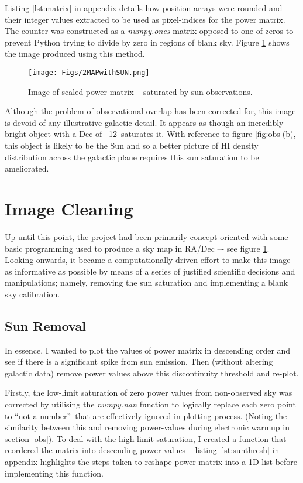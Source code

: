 \documentclass[11pt]{article} %
\begin{document}
Listing \ref{lst:matrix} in appendix details how position arrays were rounded and their integer values extracted to be used as pixel-indices for the power matrix. The counter was constructed as a \textit{numpy.ones} matrix opposed to one of zeros to prevent Python trying to divide by zero in regions of blank sky. Figure \ref{fig:matrix} shows the image produced using this method.



\begin{figure}
\centering
\texttt{[image: Figs/2MAPwithSUN.png]}
\caption{Image of scaled power matrix – saturated by sun observations.}
\label{fig:matrix}
\end{figure}

Although the problem of observational overlap has been corrected for, this image is devoid of any illustrative galactic detail. It appears as though an incredibly bright object with a Dec of ~12\degree~saturates it. With reference to figure \ref{fig:obs}(b), this object is likely to be the Sun and so a better picture of HI density distribution across the galactic plane requires this sun saturation to be ameliorated.

\section{Image Cleaning} \label{cleaning}

Up until this point, the project had been primarily concept-oriented with some basic programming used to produce a sky map in RA/Dec –- see figure \ref{fig:matrix}. Looking onwards, it became a computationally driven effort to make this image as informative as possible by means of a series of justified scientific decisions and manipulations; namely, removing the sun saturation and implementing a blank sky calibration.

\subsection{Sun Removal}

In essence, I wanted to plot the values of power matrix in descending order and see if there is a significant spike from sun emission. Then (without altering galactic data) remove power values above this discontinuity threshold and re-plot.

Firstly, the low-limit saturation of zero power values from non-observed sky was corrected by utilising the \textit{numpy.nan} function to logically replace each zero point to \textquotedblleft not a number\textquotedblright~that are effectively ignored in plotting process. (Noting the similarity between this and removing power-values during electronic warmup in section \ref{obs}). To deal with the high-limit saturation, I created a function that reordered the matrix into descending power values -- listing \ref{lst:sunthresh} in appendix highlights the steps taken to reshape power matrix into a 1D list before implementing this function. 
\end{document}
